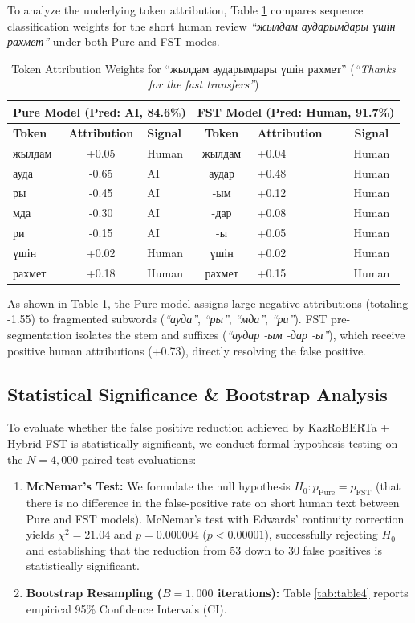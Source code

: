 \documentclass[runningheads]{llncs}
\begin{document}
To analyze the underlying token attribution, Table \ref{tab:table3} compares sequence classification weights for the short human review \textit{``жылдам аударымдары үшін рахмет''} under both Pure and FST modes.

\begin{table}[htbp]
\caption{Token Attribution Weights for ``жылдам аударымдары үшін рахмет'' (\textit{``Thanks for the fast transfers''})}
\label{tab:table3}
\centering
\footnotesize
\setlength{\tabcolsep}{4.5pt}
\begin{tabular}{lclclc}
\toprule
\multicolumn{3}{c}{\textbf{Pure Model (Pred: AI, 84.6\%)}} & \multicolumn{3}{c}{\textbf{FST Model (Pred: Human, 91.7\%)}} \\
\midrule
\textbf{Token} & \textbf{Attribution} & \textbf{Signal} & \textbf{Token} & \textbf{Attribution} & \textbf{Signal} \\
жылдам & +0.05 & Human & жылдам & +0.04 & Human \\
ауда & -0.65 & AI & аудар & +0.48 & Human \\
ры & -0.45 & AI & -ым & +0.12 & Human \\
мда & -0.30 & AI & -дар & +0.08 & Human \\
ри & -0.15 & AI & -ы & +0.05 & Human \\
үшін & +0.02 & Human & үшін & +0.02 & Human \\
рахмет & +0.18 & Human & рахмет & +0.15 & Human \\
\bottomrule
\end{tabular}
\end{table}

As shown in Table \ref{tab:table3}, the Pure model assigns large negative attributions (totaling -1.55) to fragmented subwords (\textit{``ауда''}, \textit{``ры''}, \textit{``мда''}, \textit{``ри''}). FST pre-segmentation isolates the stem and suffixes (\textit{``аудар -ым -дар -ы''}), which receive positive human attributions (+0.73), directly resolving the false positive.

\subsection{Statistical Significance \& Bootstrap Analysis}
To evaluate whether the false positive reduction achieved by KazRoBERTa + Hybrid FST is statistically significant, we conduct formal hypothesis testing on the $N = 4,000$ paired test evaluations:
\begin{enumerate}
\item \textbf{McNemar's Test:} We formulate the null hypothesis $H_0: p_{\mathrm{Pure}} = p_{\mathrm{FST}}$ (that there is no difference in the false-positive rate on short human text between Pure and FST models). McNemar's test with Edwards' continuity correction yields $\chi^2 = 21.04$ and $p = 0.000004$ ($p < 0.00001$), successfully rejecting $H_0$ and establishing that the reduction from 53 down to 30 false positives is statistically significant.
\item \textbf{Bootstrap Resampling ($B = 1,000$ iterations):} Table \ref{tab:table4} reports empirical 95\% Confidence Intervals (CI).
\end{enumerate}
\end{document}
